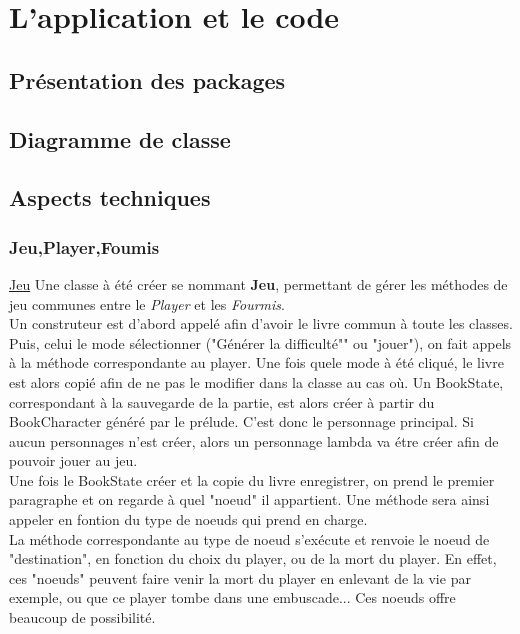\chapter{L'application et le code}



	\section{Présentation des packages}



	\section{Diagramme de classe}



	\section{Aspects techniques}

		\subsection{Jeu,Player,Foumis}
			\underline{Jeu}
			Une classe à été créer se nommant \textbf{Jeu}, permettant de gérer les méthodes de jeu communes entre le \textit{Player} et les \textit{Fourmis}.\\
			Un construteur est d'abord appelé afin d'avoir le livre commun à toute les classes. Puis, celui le mode sélectionner ("Générer la difficulté"" ou "jouer"), on fait appels à la méthode correspondante au player. Une fois quele mode à été cliqué, le livre est alors copié afin de ne pas le modifier dans la classe au cas où. Un BookState, correspondant à la sauvegarde de la partie, est alors créer à partir du BookCharacter généré par le prélude. C'est donc le personnage principal. Si aucun personnages n'est créer, alors un personnage lambda va étre créer afin de pouvoir jouer au jeu.\\
			Une fois le BookState créer et la copie du livre enregistrer, on prend le premier paragraphe et on regarde à quel "noeud" il appartient. Une méthode sera ainsi appeler en fontion du type de noeuds qui prend en charge.\\
			La méthode correspondante au type de noeud s'exécute et renvoie le noeud de "destination", en fonction du choix du player, ou de la mort du player. En effet, ces "noeuds" peuvent faire venir la mort du player en enlevant de la vie par exemple, ou que ce player tombe dans une embuscade... Ces noeuds offre beaucoup de possibilité.\\

